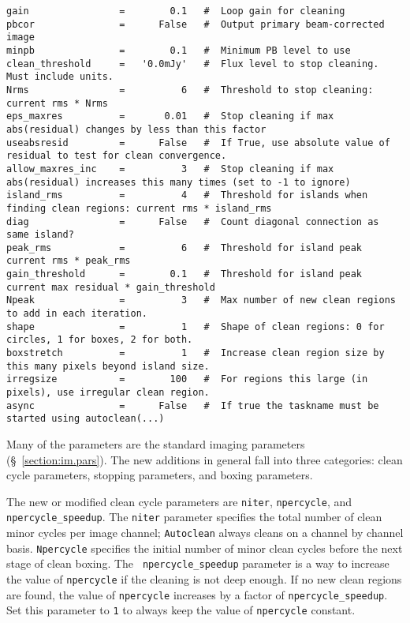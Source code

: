 \begin{verbatim}
gain                =        0.1   #  Loop gain for cleaning
pbcor               =      False   #  Output primary beam-corrected image
minpb               =        0.1   #  Minimum PB level to use
clean_threshold     =   '0.0mJy'   #  Flux level to stop cleaning.  Must include units.
Nrms                =          6   #  Threshold to stop cleaning: current rms * Nrms
eps_maxres          =       0.01   #  Stop cleaning if max abs(residual) changes by less than this factor
useabsresid         =      False   #  If True, use absolute value of residual to test for clean convergence.
allow_maxres_inc    =          3   #  Stop cleaning if max abs(residual) increases this many times (set to -1 to ignore)
island_rms          =          4   #  Threshold for islands when finding clean regions: current rms * island_rms
diag                =      False   #  Count diagonal connection as same island?
peak_rms            =          6   #  Threshold for island peak current rms * peak_rms
gain_threshold      =        0.1   #  Threshold for island peak current max residual * gain_threshold
Npeak               =          3   #  Max number of new clean regions to add in each iteration.
shape               =          1   #  Shape of clean regions: 0 for circles, 1 for boxes, 2 for both.
boxstretch          =          1   #  Increase clean region size by this many pixels beyond island size.
irregsize           =        100   #  For regions this large (in pixels), use irregular clean region.
async               =      False   #  If true the taskname must be started using autoclean(...)
\end{verbatim}
\normalsize 
Many of the parameters are the standard imaging parameters
(\S~\ref{section:im.pars}).  
The new additions in general fall into three categories: clean cycle
parameters, stopping parameters, and boxing parameters.

The new or modified clean cycle parameters are {\tt niter}, {\tt npercycle},
and {\tt npercycle_speedup}.  The {\tt niter} parameter specifies the total
number of clean minor cycles per image channel; {\tt Autoclean} always cleans
on a channel by channel basis.  {\tt Npercycle} specifies the initial number of
minor clean cycles before the next stage of clean boxing.  The {\tt
npercycle_speedup} parameter is a way to increase the value of {\tt npercycle}
if the cleaning is not deep enough.  If no new clean regions are found, the
value of {\tt npercycle} increases by a factor of {\tt npercycle_speedup}.  Set
this parameter to {\tt 1} to always keep the value of {\tt npercycle} constant.

